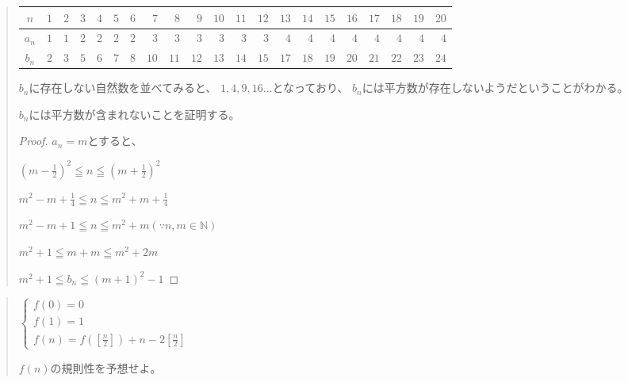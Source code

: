 \documentclass[uplatex,fleqn]{jsbook}
\begin{document}
\begin{quote}
    \begin{table}[h]
        \begin{center}
            \begin{tabular}{|c||r|r|r|r|r|r|r|r|r|r|r|r|r|r|r|r|r|r|r|r|}
                \hline
                $n$ & $1$ & $2$ & $3$ & $4$ & $5$ & $6$ & $7$ & $8$ & $9$ & $10$ & $11$ & $12$ & $13$ & $14$ & $15$ & $16$ & $17$ & $18$ & $19$ & $20$\\\hline
                $a_n$ & $1$ & $1$ & $2$ & $2$ & $2$ & $2$ & $3$ & $3$ & $3$ & $3$ & $3$ & $3$ & $4$ & $4$ & $4$ & $4$ & $4$ & $4$ & $4$ & $4$\\\hline
                $b_n$ & $2$ & $3$ & $5$ & $6$ & $7$ & $8$ & $10$ & $11$ & $12$ & $13$ & $14$ & $15$ & $17$ & $18$ & $19$ & $20$ & $21$ & $22$ & $23$ & $24$\\\hline
            \end{tabular}
        \end{center}
    \end{table}

    $b_n$に存在しない自然数を並べてみると、
    $1,4,9,16\dots$となっており、
    $b_n$には平方数が存在しないようだということがわかる。

    $b_n$には平方数が含まれないことを証明する。

    \begin{proof}
        $a_n=m$とすると、

        $\displaystyle \left(m-\frac{1}{2}\right) ^2\leqq n\leqq \left(m+\frac{1}{2}\right) ^2$

        $\displaystyle m^2-m+\frac{1}{4}\leqq n \leqq m^2+m+\frac{1}{4}$

        $\displaystyle m^2-m+1\leqq n \leqq m^2+m \left(\because n,m \in \mathbb{N}\right)$

        $m^2+1\leqq m+m \leqq m^2+2m$

        $m^2+1\leqq b_n \leqq \left(m+1\right)^2-1$

    \end{proof}

\end{quote}

\begin{quote}
    \begin{math}
        \begin{cases}
            f\left(0\right)=0\\
            f\left(1\right)=1\\
            \displaystyle f\left(n\right)=f\left(\left[\frac{n}{2}\right]\right)+n-2\left[\frac{n}{2}\right]
        \end{cases}
    \end{math}

    $f\left(n\right)$の規則性を予想せよ。
\end{quote}
\end{document}
